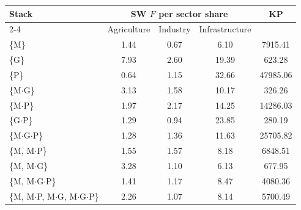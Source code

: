\begin{tabular}{@{}lcccc@{}}
\toprule
Stack & \multicolumn{3}{c}{SW $F$ per sector share} & KP \\
\cmidrule(lr){2-4}
 & Agriculture & Industry & Infrastructure & \\
\midrule
\{M\} & 1.44 & 0.67 & 6.10 & 7915.41 \\
\{G\} & 7.93 & 2.60 & 19.39 & 623.28 \\
\{P\} & 0.64 & 1.15 & 32.66 & 47985.06 \\
\{M$\cdot$G\} & 3.13 & 1.58 & 10.17 & 326.26 \\
\{M$\cdot$P\} & 1.97 & 2.17 & 14.25 & 14286.03 \\
\{G$\cdot$P\} & 1.29 & 0.94 & 23.85 & 280.19 \\
\{M$\cdot$G$\cdot$P\} & 1.28 & 1.36 & 11.63 & 25705.82 \\
\addlinespace
\{M, M$\cdot$P\} & 1.55 & 1.57 & 8.18 & 6848.51 \\
\{M, M$\cdot$G\} & 3.28 & 1.10 & 6.13 & 677.95 \\
\{M, M$\cdot$G$\cdot$P\} & 1.41 & 1.17 & 8.47 & 4080.36 \\
\{M, M$\cdot$P, M$\cdot$G, M$\cdot$G$\cdot$P\} & 2.26 & 1.07 & 8.14 & 5700.49 \\
\bottomrule
\end{tabular}
